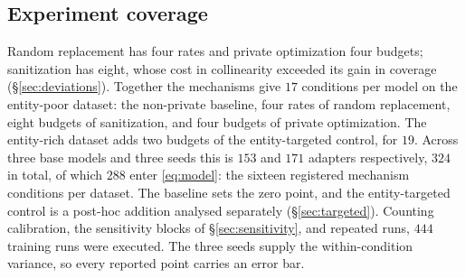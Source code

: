 \subsection{Experiment coverage}
Random replacement has four rates and private optimization four budgets;
sanitization has eight,
whose cost in collinearity exceeded its gain in coverage (\S\ref{sec:deviations}).
Together the mechanisms give $17$ conditions per model on the entity-poor dataset:
the non-private baseline,
four rates of random replacement,
eight budgets of sanitization,
and four budgets of private optimization.
The entity-rich dataset adds two budgets of the entity-targeted control, for $19$.
Across three base models and three seeds this is $153$ and $171$ adapters respectively,
$324$ in total,
of which $288$ enter \eqref{eq:model}:
the sixteen registered mechanism conditions per dataset.
The baseline sets the zero point,
and the entity-targeted control is a post-hoc addition analysed separately (\S\ref{sec:targeted}).
Counting calibration,
the sensitivity blocks of \S\ref{sec:sensitivity},
and repeated runs,
$444$ training runs were executed.
The three seeds supply the within-condition variance,
so every reported point carries an error bar.
